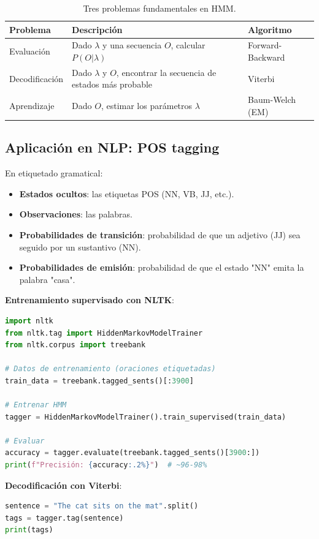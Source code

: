 \documentclass[12pt,a4paper,openany,oneside]{book}
\begin{document}
\begin{table}[h]
\centering
\begin{tabular}{|l|l|l|}
\hline
\textbf{Problema} & \textbf{Descripción} & \textbf{Algoritmo} \\
\hline
Evaluación & Dado \(\lambda\) y una secuencia \(O\), calcular \(P(O|\lambda)\) & Forward-Backward \\
Decodificación & Dado \(\lambda\) y \(O\), encontrar la secuencia de estados más probable & Viterbi \\
Aprendizaje & Dado \(O\), estimar los parámetros \(\lambda\) & Baum-Welch (EM) \\
\hline
\end{tabular}
\caption{Tres problemas fundamentales en HMM.}
\end{table}

\subsection{Aplicación en NLP: POS tagging}
En etiquetado gramatical:
\begin{itemize}
    \item \textbf{Estados ocultos}: las etiquetas POS (NN, VB, JJ, etc.).
    \item \textbf{Observaciones}: las palabras.
    \item \textbf{Probabilidades de transición}: probabilidad de que un adjetivo (JJ) sea seguido por un sustantivo (NN).
    \item \textbf{Probabilidades de emisión}: probabilidad de que el estado "NN" emita la palabra "casa".
\end{itemize}

\textbf{Entrenamiento supervisado con NLTK}:
\begin{lstlisting}[language=Python]
import nltk
from nltk.tag import HiddenMarkovModelTrainer
from nltk.corpus import treebank

# Datos de entrenamiento (oraciones etiquetadas)
train_data = treebank.tagged_sents()[:3900]

# Entrenar HMM
tagger = HiddenMarkovModelTrainer().train_supervised(train_data)

# Evaluar
accuracy = tagger.evaluate(treebank.tagged_sents()[3900:])
print(f"Precisión: {accuracy:.2%}")  # ~96-98%
\end{lstlisting}

\textbf{Decodificación con Viterbi}:
\begin{lstlisting}[language=Python]
sentence = "The cat sits on the mat".split()
tags = tagger.tag(sentence)
print(tags)
\end{lstlisting}
\end{document}
